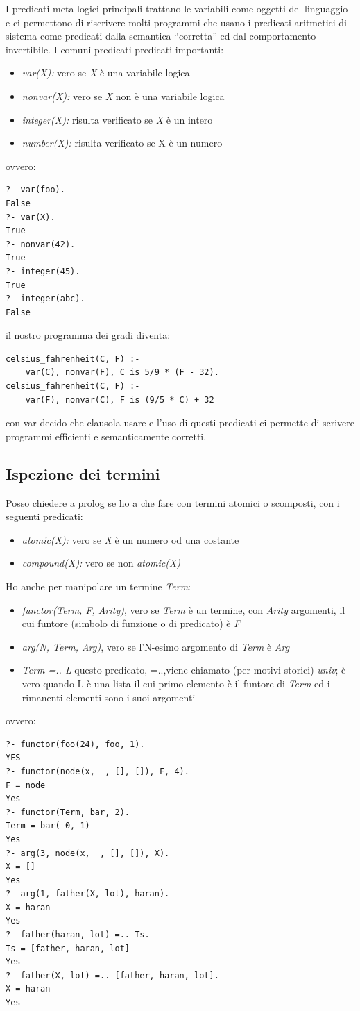 \documentclass[a4paper]{report}
\begin{document}
I predicati meta-logici principali trattano le variabili come oggetti del linguaggio e ci permettono di riscrivere molti programmi
che usano i predicati aritmetici di sistema come predicati dalla semantica “corretta” ed dal comportamento invertibile.\newline
I comuni predicati predicati importanti:
\begin{itemize}
\item \textit{var(X):}  vero se \textit{X} è una variabile logica
\item \textit{nonvar(X):}  vero se \textit{X} non è una variabile logica
\item \textit{integer(X):} risulta verificato se \textit{X} è un intero
\item \textit{number(X):} risulta verificato se X è un numero
\end{itemize}
ovvero:
\begin{verbatim}
?- var(foo).
False
?- var(X).
True
?- nonvar(42).
True
?- integer(45).
True
?- integer(abc).
False
\end{verbatim}
il nostro programma dei gradi diventa:
\begin{verbatim}
celsius_fahrenheit(C, F) :- 
	var(C), nonvar(F), C is 5/9 * (F - 32).
celsius_fahrenheit(C, F) :- 
	var(F), nonvar(C), F is (9/5 * C) + 32
\end{verbatim}
con var decido che clausola usare e l'uso di questi predicati ci permette di scrivere programmi efficienti e semanticamente corretti.
\subsection{Ispezione dei termini}
Posso chiedere a prolog se ho a che fare con termini atomici o scomposti, con i seguenti predicati:
\begin{itemize}
\item \textit{atomic(X): }vero se \textit{X} è un numero od una costante
\item \textit{compound(X):} vero se non \textit{atomic(X)}
\end{itemize}
Ho anche per manipolare un termine \textit{Term}:
\begin{itemize}
\item \textit{functor(Term, F, Arity)},
vero se \textit{Term} è un termine, con\textit{ Arity }argomenti, il cui funtore (simbolo di funzione o di predicato) è \textit{F}
\item \textit{arg(N, Term, Arg)},
vero se l’N-esimo argomento di \textit{Term }è \textit{Arg}
\item \textit{Term =.. L}
questo predicato, =..,viene chiamato (per motivi storici) \textit{univ}; è vero quando L è una lista il cui primo elemento è il funtore di \textit{Term} ed i rimanenti elementi sono i suoi argomenti
\end{itemize}
ovvero:
\begin{verbatim}
?- functor(foo(24), foo, 1).
YES
?- functor(node(x, _, [], []), F, 4).
F = node
Yes
?- functor(Term, bar, 2).
Term = bar(_0,_1)
Yes
?- arg(3, node(x, _, [], []), X).
X = []
Yes
?- arg(1, father(X, lot), haran).
X = haran
Yes
?- father(haran, lot) =.. Ts.
Ts = [father, haran, lot]
Yes
?- father(X, lot) =.. [father, haran, lot].
X = haran
Yes
\end{verbatim}
\end{document}
